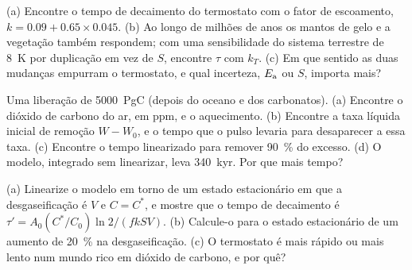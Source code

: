 \begin{exercise}[$\star\star\star$]\label{exo:b2:deep-time-climate:10}
(a) Encontre o tempo de decaimento do termostato com o fator de escoamento, $k = 0.09 + 0.65\times0.045$.
(b) Ao longo de milhões de anos os mantos de gelo e a vegetação também respondem; com uma sensibilidade do sistema
terrestre de \qty{8}{K} por duplicação em vez de $S$, encontre $\tau$ com $k_T$. (c) Em que sentido as
duas mudanças empurram o termostato, e qual incerteza, $E_{\text a}$ ou $S$, importa mais?
\end{exercise}

\begin{exercise}[$\star\star\star$]\label{exo:b2:deep-time-climate:11}
Uma liberação de \qty{5000}{PgC} (depois do oceano e dos carbonatos). (a) Encontre o dióxido de carbono do
ar, em ppm, e o aquecimento. (b) Encontre a taxa líquida inicial de remoção $W - W_0$, e o tempo que o
pulso levaria para desaparecer a essa taxa. (c) Encontre o tempo linearizado para remover \qty{90}{\percent}
do excesso. (d) O modelo, integrado sem linearizar, leva \qty{340}{kyr}. Por que mais tempo?
\end{exercise}

\begin{exercise}[$\star\star\star$]\label{exo:b2:deep-time-climate:12}
(a) Linearize o modelo em torno de um estado estacionário em que a desgaseificação é $V$ e $C = C^*$, e mostre que
o tempo de decaimento é $\tau' = A_0 (C^*/C_0)\ln 2/(f k S V)$. (b) Calcule-o para o estado estacionário
de um aumento de \qty{20}{\percent} na desgaseificação. (c) O termostato é mais rápido ou mais lento num mundo rico em
dióxido de carbono, e por quê?
\end{exercise}

